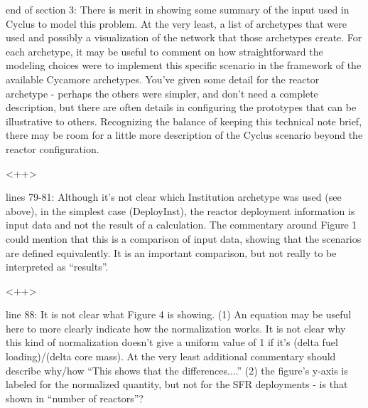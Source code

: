 \documentclass[answers,11pt]{exam}
\begin{document}
\begin{questions}
        \question end of section 3: There is merit in showing some summary of 
        the input used in Cyclus to model this problem.  At the very least, a 
        list of archetypes that were used and possibly a visualization of the 
        network that those archetypes create.  For each archetype, it may be 
        useful to comment on how straightforward the modeling choices were to 
        implement this specific scenario in the framework of the available 
        Cycamore archetypes.  You've given some detail for the reactor 
        archetype - perhaps the others were simpler, and don't need a complete 
        description, but there are often details in configuring the prototypes 
        that can be illustrative to others.  Recognizing the balance of keeping 
        this technical note brief, there may be room for a little more 
        description of the Cyclus scenario beyond the reactor configuration.

        \begin{solution}
        <++>
        \end{solution}

        \question lines 79-81: Although it's not clear which Institution 
        archetype was used (see above), in the simplest case (DeployInst), the 
        reactor deployment information is input data and not the result of a 
        calculation.  The commentary around Figure 1 could mention that this is 
        a comparison of input data, showing that the scenarios are defined 
        equivalently.  It is an important comparison, but not really to be 
        interpreted as ``results''.

        \begin{solution}
        <++>
        \end{solution}


        \question line 88: It is not clear what Figure 4 is showing.  (1) An 
        equation may be useful here to more clearly indicate how the 
        normalization works. It is not clear why this kind of normalization 
        doesn't give a uniform value of 1 if it's (delta fuel loading)/(delta 
        core mass).  At the very least additional commentary should describe 
        why/how ``This shows that the differences....''  (2) the figure's 
        y-axis is labeled for the normalized quantity, but not for the SFR 
        deployments - is that shown in ``number of reactors''?


\end{questions}
\end{document}
